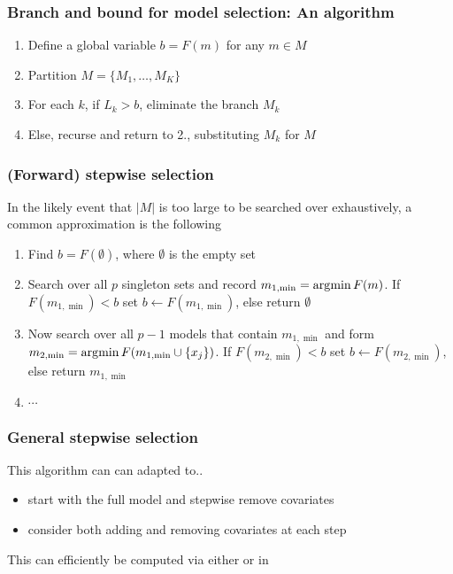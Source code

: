 \documentclass{beamer}
\begin{document}
\begin{frame}[fragile]
\frametitle{Branch and bound for model selection: An algorithm}
\begin{enumerate}
\item Define a global variable $b = F(m)$ for any $m \in M$

\item Partition $M = \{M_1,\ldots,M_K\}$\Note
\item For each $k$, if $L_k > b$, eliminate the branch $M_k$
\item Else, recurse and return to \textcolor{bluemain}{2.}, substituting $M_k$ for $M$
\end{enumerate}

\end{frame}

\begin{frame}[fragile]
\frametitle{(Forward) stepwise selection}
In the likely event that $|M|$ is too large to be searched over exhaustively, a common 
approximation is the following

\begin{enumerate}
\item Find $b = F(\emptyset)$, where $\emptyset$ is the empty set
\item Search over all $p$ singleton sets and record $m_{1,\min} = \operatorname*{\arg\!\min} F(m)$.  If $F(m_{1,\min}) < b$ set  $b \leftarrow F(m_{1,\min})$, else return $\emptyset$
\item Now search over all $p-1$ models that contain $m_{1,\min}$ and form $m_{2,\min} = \operatorname*{\arg\!\min} F(m_{1,\min} \cup \{x_j\})$.
If $F(m_{2,\min}) < b$ set  $b \leftarrow F(m_{2,\min})$, else return $m_{1,\min}$
\item $\cdots$
\end{enumerate}

\end{frame}

\begin{frame}
\frametitle{General stepwise selection}
This algorithm can can adapted to..
\begin{itemize}
\item start with the full model and stepwise remove covariates 

\item consider both adding and removing covariates at each step
\end{itemize}

\vsp
This can efficiently be computed via either  or  in 

\end{frame}
\end{document}
